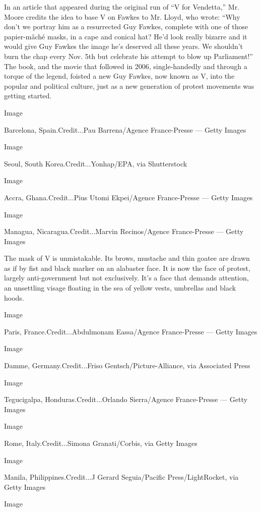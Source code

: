 In an article that appeared during the original run of ``V for
Vendetta,'' Mr. Moore credits the idea to base V on Fawkes to Mr. Lloyd,
who wrote: ``Why don't we portray him as a resurrected Guy Fawkes,
complete with one of those papier-mâché masks, in a cape and conical
hat? He'd look really bizarre and it would give Guy Fawkes the image
he's deserved all these years. We shouldn't burn the chap every Nov. 5th
but celebrate his attempt to blow up Parliament!'' The book, and the
movie that followed in 2006, single-handedly and through a torque of the
legend, foisted a new Guy Fawkes, now known as V, into the popular and
political culture, just as a new generation of protest movements was
getting started.

Image

Barcelona, Spain.Credit...Pau Barrena/Agence France-Presse --- Getty
Images

Image

Seoul, South Korea.Credit...Yonhap/EPA, via Shutterstock

Image

Accra, Ghana.Credit...Pius Utomi Ekpei/Agence France-Presse --- Getty
Images

Image

Managua, Nicaragua.Credit...Marvin Recinos/Agence France-Presse ---
Getty Images

The mask of V is unmistakable. Its brows, mustache and thin goatee are
drawn as if by fist and black marker on an alabaster face. It is now the
face of protest, largely anti-government but not exclusively. It's a
face that demands attention, an unsettling visage floating in the sea of
yellow vests, umbrellas and black hoods.

Image

Paris, France.Credit...Abdulmonam Eassa/Agence France-Presse --- Getty
Images

Image

Damme, Germany.Credit...Friso Gentsch/Picture-Alliance, via Associated
Press

Image

Tegucigalpa, Honduras.Credit...Orlando Sierra/Agence France-Presse ---
Getty Images

Image

Rome, Italy.Credit...Simona Granati/Corbis, via Getty Images

Image

Manila, Philippines.Credit...J Gerard Seguia/Pacific Press/LightRocket,
via Getty Images

Image

